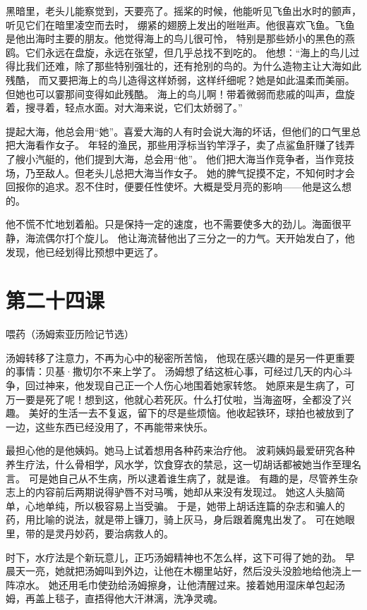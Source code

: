 \documentclass[12pt,UTF8]{ctexbook}
\begin{document}
黑暗里，老头儿能察觉到，天要亮了。摇桨的时候，他能听见飞鱼出水时的颤声，听见它们在暗里凌空而去时，
绷紧的翅膀上发出的咝咝声。他很喜欢飞鱼。飞鱼是他出海时主要的朋友。他觉得海上的鸟儿很可怜，
特别是那些娇小的黑色的燕鸥。它们永远在盘旋，永远在张望，但几乎总找不到吃的。
他想：“海上的鸟儿过得比我们还难，除了那些特别强壮的，还有抢别的鸟的。为什么造物主让大海如此残酷，
而又要把海上的鸟儿造得这样娇弱，这样纤细呢？她是如此温柔而美丽。但她也可以霎那间变得如此残酷。
海上的鸟儿啊！带着微弱而悲戚的叫声，盘旋着，搜寻着，轻点水面。对大海来说，它们太娇弱了。”

提起大海，他总会用“她”。喜爱大海的人有时会说大海的坏话，但他们的口气里总把大海看作女子。
年轻的渔民，那些用浮标当钓竿浮子，卖了点鲨鱼肝赚了钱弄了艘小汽艇的，他们提到大海，总会用“他”。
他们把大海当作竞争者，当作竞技场，乃至敌人。但老头儿总把大海当作女子。
她的脾气捉摸不定，不知何时才会回报你的追求。忍不住时，便要任性使坏。大概是受月亮的影响——他是这么想的。

他不慌不忙地划着船。只是保持一定的速度，也不需要使多大的劲儿。海面很平静，海流偶尔打个旋儿。
他让海流替他出了三分之一的力气。天开始发白了，他发现，他已经划得比预想中更远了。

\section{第二十四课}

喂药（汤姆索亚历险记节选）

汤姆转移了注意力，不再为心中的秘密所苦恼，
他现在感兴趣的是另一件更重要的事情：贝基·撒切尔不来上学了。
汤姆想了结这桩心事，可经过几天的内心斗争，回过神来，他发现自己正一个人伤心地围着她家转悠。
她原来是生病了，可万一要是死了呢！想到这，他就心若死灰。什么打仗啦，当海盗呀，全都没了兴趣。
美好的生活一去不复返，留下的尽是些烦恼。他收起铁环，球拍也被放到了一边，这些东西已经没用了，不再能带来快乐。

最担心他的是他姨妈。她马上试着想用各种药来治疗他。
波莉姨妈最爱研究各种养生疗法，什么骨相学，风水学，饮食穿衣的禁忌，这一切胡话都被她当作至理名言。
可是她自己从不生病，所以逮着谁生病了，就是谁。
有趣的是，尽管养生杂志上的内容前后两期说得驴唇不对马嘴，她却从来没有发现过。
她这人头脑简单，心地单纯，所以极容易上当受骗。
于是，她带上胡话连篇的杂志和骗人的药，用比喻的说法，就是带上镰刀，骑上灰马，身后跟着魔鬼出发了。
可在她眼里，带的是灵丹妙药，要治病救人的。

时下，水疗法是个新玩意儿，正巧汤姆精神也不怎么样，这下可得了她的劲。
早晨天一亮，她就把汤姆叫到外边，让他在木棚里站好，然后没头没脸地给他浇上一阵凉水。
她还用毛巾使劲给汤姆擦身，让他清醒过来。接着她用湿床单包起汤姆，再盖上毯子，直捂得他大汗淋漓，洗净灵魂。
\end{document}
